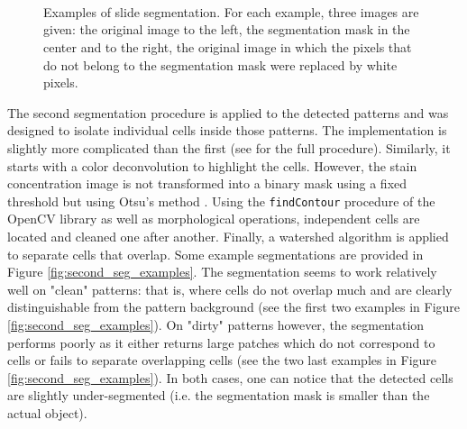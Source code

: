 \begin{figure}
	\center
	\subfigure{
	} \\
	\subfigure{
	} \\
	\subfigure{
	} \\
	\subfigure{
	}
	\caption{Examples of slide segmentation. For each example, three images are given: the original image to the left, the segmentation mask in the center and to the right, the original image in which the pixels that do not belong to the segmentation mask were replaced by white pixels.}
	\label{fig:first_seg_examples}
\end{figure}

The second segmentation procedure is applied to the detected patterns and was designed to isolate individual cells inside those patterns. The implementation is slightly more complicated than the first (see \cite{adeblire2013} for the full procedure). Similarly, it starts with a color deconvolution to highlight the cells. However, the stain concentration image is not transformed into a binary mask using a fixed threshold but using Otsu's method \cite{otsu1975threshold}. Using the \texttt{findContour} procedure of the OpenCV library as well as morphological operations, independent cells are located and cleaned one after another. Finally, a watershed algorithm is applied to separate cells that overlap. Some example segmentations are provided in Figure \ref{fig:second_seg_examples}. The segmentation seems to work relatively well on "clean" patterns: that is, where cells do not overlap much and are clearly distinguishable from the pattern background (see the first two examples in Figure \ref{fig:second_seg_examples}). On "dirty" patterns however, the segmentation performs poorly as it either returns large patches which do not correspond to cells or fails to separate overlapping cells (see the two last examples in Figure \ref{fig:second_seg_examples}). In both cases, one can notice that the detected cells are slightly under-segmented (i.e. the segmentation mask is smaller than the actual object).

